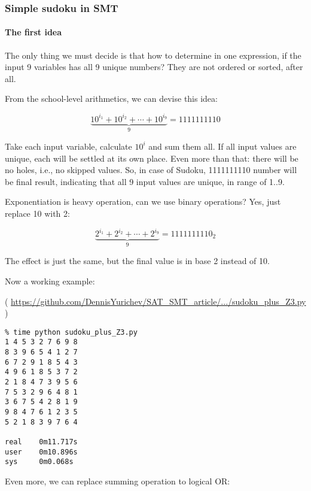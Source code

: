\subsubsection{Simple sudoku in SMT}
\label{sudoku_SMT}

\paragraph{The first idea}

The only thing we must decide is that how to determine in one expression, if the input 9 variables has all 9 unique numbers?
They are not ordered or sorted, after all.

From the school-level arithmetics, we can devise this idea:

\begin{equation}
\underbrace{10^{i_1} + 10^{i_2} + \cdots + 10^{i_9}}_9 = 1111111110
\end{equation}

Take each input variable, calculate $10^i$ and sum them all.
If all input values are unique, each will be settled at its own place.
Even more than that: there will be no holes, i.e., no skipped values.
So, in case of Sudoku, 1111111110 number will be final result, indicating that all 9 input values are unique, in range of 1..9.

Exponentiation is heavy operation, can we use binary operations? Yes, just replace 10 with 2:

\begin{equation}
\underbrace{2^{i_1} + 2^{i_2} + \cdots + 2^{i_9}}_9 = 1111111110_2
\end{equation}

The effect is just the same, but the final value is in base 2 instead of 10.

Now a working example:


( \url{https://github.com/DennisYurichev/SAT_SMT_article/.../sudoku_plus_Z3.py} )

\begin{lstlisting}
% time python sudoku_plus_Z3.py
1 4 5 3 2 7 6 9 8
8 3 9 6 5 4 1 2 7
6 7 2 9 1 8 5 4 3
4 9 6 1 8 5 3 7 2
2 1 8 4 7 3 9 5 6
7 5 3 2 9 6 4 8 1
3 6 7 5 4 2 8 1 9
9 8 4 7 6 1 2 3 5
5 2 1 8 3 9 7 6 4

real    0m11.717s
user    0m10.896s
sys     0m0.068s
\end{lstlisting}

Even more, we can replace summing operation to logical OR:


